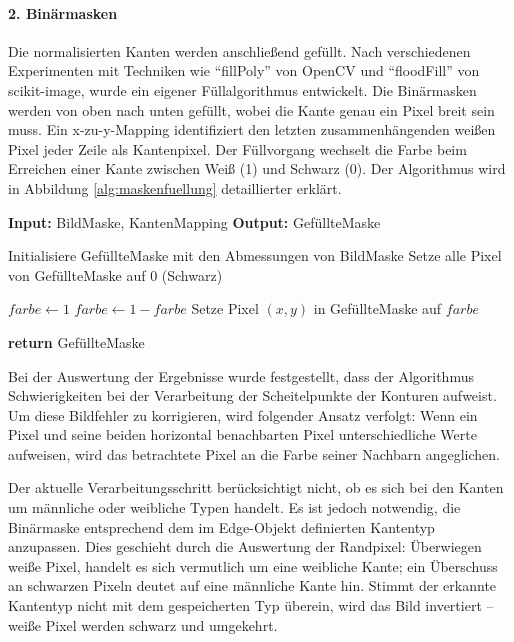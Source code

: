 \paragraph{2. Binärmasken}
Die normalisierten Kanten werden anschließend gefüllt. Nach verschiedenen Experimenten mit Techniken wie ``fillPoly'' von OpenCV und ``floodFill'' von scikit-image, wurde ein eigener Füllalgorithmus entwickelt. Die Binärmasken werden von oben nach unten gefüllt, wobei die Kante genau ein Pixel breit sein muss. Ein x-zu-y-Mapping identifiziert den letzten zusammenhängenden weißen Pixel jeder Zeile als Kantenpixel. Der Füllvorgang wechselt die Farbe beim Erreichen einer Kante zwischen Weiß (1) und Schwarz (0). Der Algorithmus wird in Abbildung \ref{alg:maskenfuellung} detaillierter erklärt.
\begin{algorithm}
\caption{Maskenfüllungsalgorithmus}
\label{alg:maskenfuellung}
\begin{algorithmic}[1]
\State \textbf{Input:} BildMaske, KantenMapping
\State \textbf{Output:} GefüllteMaske

\State Initialisiere GefüllteMaske mit den Abmessungen von BildMaske
\State Setze alle Pixel von GefüllteMaske auf 0 (Schwarz)

    \State $farbe \gets 1$  
            \State $farbe \gets 1 - farbe$  
        \EndIf
        \State Setze Pixel $(x, y)$ in GefüllteMaske auf $farbe$
    \EndFor
\EndFor

\State \textbf{return} GefüllteMaske
\end{algorithmic}
\end{algorithm}

Bei der Auswertung der Ergebnisse wurde festgestellt, dass der Algorithmus Schwierigkeiten bei der Verarbeitung der Scheitelpunkte der Konturen aufweist. Um diese Bildfehler zu korrigieren, wird folgender Ansatz verfolgt: Wenn ein Pixel und seine beiden horizontal benachbarten Pixel unterschiedliche Werte aufweisen, wird das betrachtete Pixel an die Farbe seiner Nachbarn angeglichen.

Der aktuelle Verarbeitungsschritt berücksichtigt nicht, ob es sich bei den Kanten um männliche oder weibliche Typen handelt. Es ist jedoch notwendig, die Binärmaske entsprechend dem im Edge-Objekt definierten Kantentyp anzupassen. Dies geschieht durch die Auswertung der Randpixel: Überwiegen weiße Pixel, handelt es sich vermutlich um eine weibliche Kante; ein Überschuss an schwarzen Pixeln deutet auf eine männliche Kante hin. Stimmt der erkannte Kantentyp nicht mit dem gespeicherten Typ überein, wird das Bild invertiert – weiße Pixel werden schwarz und umgekehrt.

